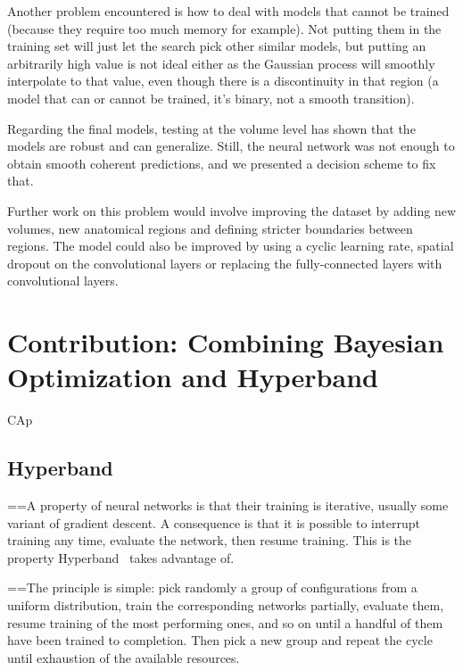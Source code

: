 Another problem encountered is how to deal with models that cannot be trained (because they require too much memory for example). Not putting them in the training set will just let the search pick other similar models, but putting an arbitrarily high value is not ideal either as the Gaussian process will smoothly interpolate to that value, even though there is a discontinuity in that region (a model that can or cannot be trained, it's binary, not a smooth transition).

Regarding the final models, testing at the volume level has shown that the models are robust and can generalize. Still, the neural network was not enough to obtain smooth coherent predictions, and we presented a decision scheme to fix that.

Further work on this problem would involve improving the dataset by adding new volumes, new anatomical regions and defining stricter boundaries between regions. The model could also be improved by using a cyclic learning rate, spatial dropout on the convolutional layers or replacing the fully-connected layers with convolutional layers.

\section{Contribution: Combining Bayesian Optimization and Hyperband}
\label{sec:cap}

CAp

\subsection{Hyperband}
\label{ssec:hyperband}

==A property of neural networks is that their training is iterative, usually some variant of gradient descent. A consequence is that it is possible to interrupt training any time, evaluate the network, then resume training. This is the property Hyperband~\cite{li2017ICLR} takes advantage of.

==The principle is simple: pick randomly a group of configurations from a uniform distribution, train the corresponding networks partially, evaluate them, resume training of the most performing ones, and so on until a handful of them have been trained to completion. Then pick a new group and repeat the cycle until exhaustion of the available resources.

